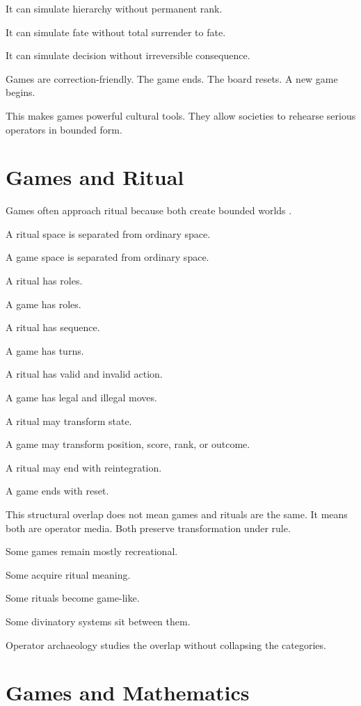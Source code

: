 \documentclass[11pt]{book}
\begin{document}
It can simulate hierarchy without permanent rank.

It can simulate fate without total surrender to fate.

It can simulate decision without irreversible consequence.

Games are correction-friendly. The game ends. The board resets. A new game begins.

This makes games powerful cultural tools. They allow societies to rehearse serious operators in bounded form.

\section{Games and Ritual}

Games often approach ritual because both create bounded worlds \cite{Murray1952BoardGames,Finkel2007AncientBoardGames,Bell1969BoardTableGames,Bell1992RitualTheory}.

A ritual space is separated from ordinary space.

A game space is separated from ordinary space.

A ritual has roles.

A game has roles.

A ritual has sequence.

A game has turns.

A ritual has valid and invalid action.

A game has legal and illegal moves.

A ritual may transform state.

A game may transform position, score, rank, or outcome.

A ritual may end with reintegration.

A game ends with reset.

This structural overlap does not mean games and rituals are the same. It means both are operator media. Both preserve transformation under rule.

Some games remain mostly recreational.

Some acquire ritual meaning.

Some rituals become game-like.

Some divinatory systems sit between them.

Operator archaeology studies the overlap without collapsing the categories.

\section{Games and Mathematics}
\end{document}
